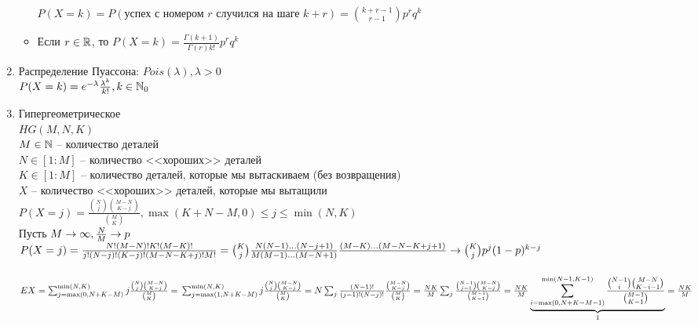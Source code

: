 \documentclass[12pt]{article}
\begin{document}
\begin{enumerate}
\begin{itemize}
        $P(X=k) = P(\text{успех с номером $r$ случился на шаге $k+r$}) = \binom{k+r-1}{r-1} p^r q^{k}$
        \item Если $r \in \Rset$, то $P(X = k) = \frac{\Gamma(k+1)}{\Gamma(r)k!} p^r q^k$
    \end{itemize}
    \item Распределение Пуассона: $Pois(\lambda), \lambda > 0$\\
    $P(X = k) = e^{-\lambda}\frac{\lambda^k}{k!}, k \in \Nset_0$
    \item Гипергеометрическое\\
    $HG(M, N, K)$\\
    $M \in \Nset$ -- количество деталей\\
    $N \in [1:M]$ -- количество <<хороших>> деталей\\
    $K \in [1:M]$ -- количество деталей, которые мы вытаскиваем (без возвращения)\\
    $X$ -- количество <<хороших>> деталей, которые мы вытащили\\
    $P(X = j) = \frac{\binom{N}{j}\binom{M-N}{K-j}}{\binom{M}{K}}, \max(K + N - M, 0) \leq j \leq \min(N, K)$\\
    Пусть $M \rto \infty, \frac{N}{M} \rto p$\\
    $P(X=j) = \frac{N!(M-N)!K!(M-K)!}{j!(N-j)!(K-j)!(M-N-K+j)! M!} \\
    = \binom{K}{j}\frac{N(N-1)\ldots (N-j+1)}{M(M-1)\ldots (M-N + 1)} \frac{(M-K)\ldots (M - N - K + j + 1)}{} \rto \binom{K}{j} p^j(1-p)^{k-j}$\\\\
    $EX = \sum_{j = \max(0, N + K - M)}^{\min(N, K)} j \frac{\binom Nj \binom{M-N}{K-j}}{\binom{M}{K}} = \\
    \sum_{j = \max(1, N + K - M)}^{\min(N, K)} j \frac{\binom Nj \binom{M-N}{K-j}}{\binom{M}{K}} = \\
    N\sum_{j} \frac{(N-1)!}{(j-1)!(N-j)!}\frac{\binom{M-N}{K-j}}{\binom{M}{K}} = \\
    \frac {NK}{M}\sum_{j} \frac{\binom{N-1}{j-1}\binom{M-N}{K-j}}{\binom{M-1}{K-1}} = \\
    \frac{NK}{M} \ub{1}{\sum_{i = \max(0, N + K - M - 1)}^{\min(N-1, K-1)} \frac{\binom{N-1}{i}\binom{M-N}{K-i-1}}{\binom{M-1}{K-1}}} = \frac{NK}{M}$
\end{enumerate}
\end{document}
